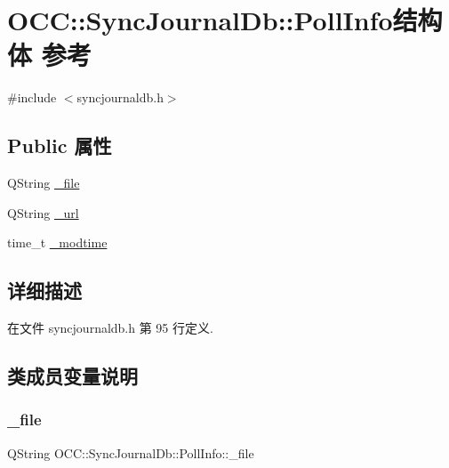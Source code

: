 \hypertarget{struct_o_c_c_1_1_sync_journal_db_1_1_poll_info}{}\section{O\+CC\+:\+:Sync\+Journal\+Db\+:\+:Poll\+Info结构体 参考}
\label{struct_o_c_c_1_1_sync_journal_db_1_1_poll_info}


{\ttfamily \#include $<$syncjournaldb.\+h$>$}

\subsection*{Public 属性}
\begin{DoxyCompactItemize}
\item 
Q\+String \hyperlink{struct_o_c_c_1_1_sync_journal_db_1_1_poll_info_a9e40fe5e9d9e3ba7c531366a4193f539}{\+\_\+file}
\item 
Q\+String \hyperlink{struct_o_c_c_1_1_sync_journal_db_1_1_poll_info_a933584502ce5d2bce4949cc4ab0694b2}{\+\_\+url}
\item 
time\+\_\+t \hyperlink{struct_o_c_c_1_1_sync_journal_db_1_1_poll_info_af2329c4ac258bdb313cf5d6b9a2519dd}{\+\_\+modtime}
\end{DoxyCompactItemize}


\subsection{详细描述}


在文件 syncjournaldb.\+h 第 95 行定义.



\subsection{类成员变量说明}
\mbox{\label{struct_o_c_c_1_1_sync_journal_db_1_1_poll_info_a9e40fe5e9d9e3ba7c531366a4193f539}} 
\subsubsection{\texorpdfstring{\+\_\+file}{\_file}}
{\footnotesize\ttfamily Q\+String O\+C\+C\+::\+Sync\+Journal\+Db\+::\+Poll\+Info\+::\+\_\+file}



